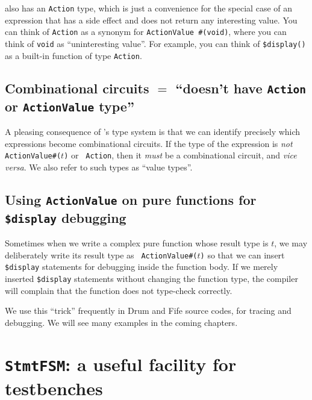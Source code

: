 {\BSV} also has an \verb|Action| type, which is just a convenience for
the special case of an expression that has a side effect and does not
return any interesting value.  You can think of \verb|Action| as a
synonym for \verb|ActionValue #(void)|, where you can think of
\verb|void| as ``uninteresting value''.  For example, you can think of
\verb|$display()| as a built-in function of type \verb|Action|.


\subsection{Combinational circuits $=$ ``doesn't have {\tt Action} or {\tt ActionValue} type''}


A pleasing consequence of {\BSV}'s type system is that we can identify
precisely which expressions become combinational circuits.  If the
type of the expression is \emph{not} {\tt ActionValue\#($t$)} or {\tt
Action}, then it \emph{must} be a combinational circuit, and
\emph{vice versa}.  We also refer to such types as ``value types''.


\subsection{Using {\tt ActionValue} on pure functions for {\tt \$display} debugging}

Sometimes when we write a complex pure function whose result type is
$t$, we may deliberately write its result type as {\tt
ActionValue\#($t$)} so that we can insert \verb|$display| statements
for debugging inside the function body.  If we merely inserted
\verb|$display| statements without changing the function type, the
compiler will complain that the function does not type-check
correctly.

We use this ``trick'' frequently in Drum and Fife source codes, for
tracing and debugging.  We will see many examples in the coming
chapters.


\section{{\tt StmtFSM}: a useful facility for testbenches}

